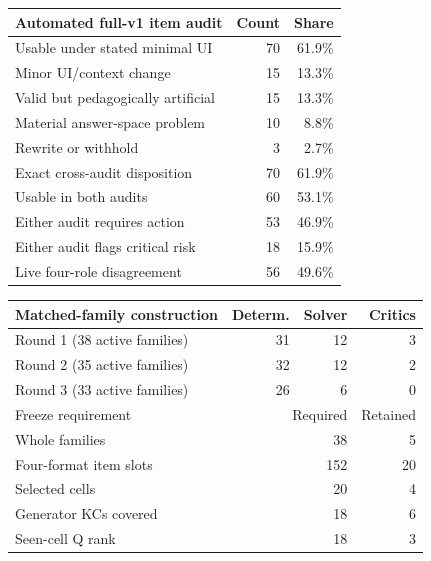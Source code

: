 \begin{table}[t]
  \centering
  \footnotesize
  \setlength{\tabcolsep}{3pt}
  \begin{minipage}[t]{.48\textwidth}
    \centering
    \begin{tabularx}{\linewidth}{@{}Xrr@{}}
      \toprule
      Automated full-v1 item audit & Count & Share \\
      \midrule
      Usable under stated minimal UI & 70 & 61.9\% \\
      Minor UI/context change & 15 & 13.3\% \\
      Valid but pedagogically artificial & 15 & 13.3\% \\
      Material answer-space problem & 10 & 8.8\% \\
      Rewrite or withhold & 3 & 2.7\% \\
      \midrule
      Exact cross-audit disposition & 70 & 61.9\% \\
      Usable in both audits & 60 & 53.1\% \\
      Either audit requires action & 53 & 46.9\% \\
      Either audit flags critical risk & 18 & 15.9\% \\
      Live four-role disagreement & 56 & 49.6\% \\
      \bottomrule
    \end{tabularx}
  \end{minipage}\hfill
  \begin{minipage}[t]{.49\textwidth}
    \centering
    \begin{tabularx}{\linewidth}{@{}Xrrr@{}}
      \toprule
      Matched-family construction & Determ. & Solver & Critics \\
      \midrule
      Round 1 (38 active families) & 31 & 12 & 3 \\
      Round 2 (35 active families) & 32 & 12 & 2 \\
      Round 3 (33 active families) & 26 & 6 & 0 \\
      \midrule
      Freeze requirement & \multicolumn{2}{r}{Required} & Retained \\
      Whole families & \multicolumn{2}{r}{38} & 5 \\
      Four-format item slots & \multicolumn{2}{r}{152} & 20 \\
      Selected cells & \multicolumn{2}{r}{20} & 4 \\
      Generator KCs covered & \multicolumn{2}{r}{18} & 6 \\
      Seen-cell Q rank & \multicolumn{2}{r}{18} & 3 \\

\end{tabularx}
\end{minipage}
\end{table}
